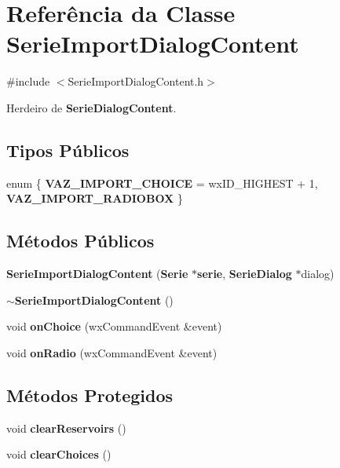 \section{Referência da Classe Serie\+Import\+Dialog\+Content}
\label{class_serie_import_dialog_content}


{\ttfamily \#include $<$Serie\+Import\+Dialog\+Content.\+h$>$}



Herdeiro de {\bf Serie\+Dialog\+Content}.

\subsection*{Tipos Públicos}
\begin{DoxyCompactItemize}
\item 
enum \{ {\bf V\+A\+Z\+\_\+\+I\+M\+P\+O\+R\+T\+\_\+\+C\+H\+O\+I\+CE} = wx\+I\+D\+\_\+\+H\+I\+G\+H\+E\+ST + 1, 
{\bf V\+A\+Z\+\_\+\+I\+M\+P\+O\+R\+T\+\_\+\+R\+A\+D\+I\+O\+B\+OX}
 \}
\end{DoxyCompactItemize}
\subsection*{Métodos Públicos}
\begin{DoxyCompactItemize}
\item 
{\bf Serie\+Import\+Dialog\+Content} ({\bf Serie} $\ast${\bf serie}, {\bf Serie\+Dialog} $\ast$dialog)
\item 
{\bf $\sim$\+Serie\+Import\+Dialog\+Content} ()
\item 
void {\bf on\+Choice} (wx\+Command\+Event \&event)
\item 
void {\bf on\+Radio} (wx\+Command\+Event \&event)
\end{DoxyCompactItemize}
\subsection*{Métodos Protegidos}
\begin{DoxyCompactItemize}
\item 
void {\bf clear\+Reservoirs} ()
\item 
void {\bf clear\+Choices} ()
\end{DoxyCompactItemize}
